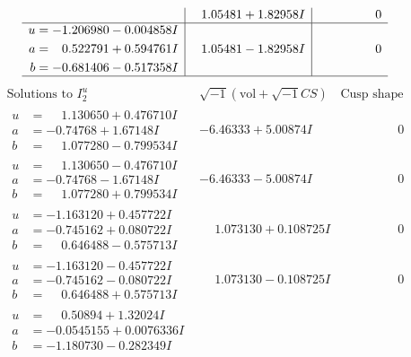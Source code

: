 \documentclass[1p]{elsarticle_modified}
\theoremstyle{definition}
\newcommand{\I}{\sqrt{-1}}
\begin{document}
$$\begin{array}{c|c|c}
 & \phantom{-}1.05481 + 1.82958 I & \phantom{-0.000000 } 0 \\ \hline\begin{aligned}
u &= -1.206980 - 0.004858 I \\
a &= \phantom{-}0.522791 + 0.594761 I \\
b &= -0.681406 - 0.517358 I\end{aligned}
 & \phantom{-}1.05481 - 1.82958 I & \phantom{-0.000000 } 0\\
 \hline 
 \end{array}$$\newpage$$\begin{array}{c|c|c}  
\text{Solutions to }I^u_{2}& \I (\text{vol} + \sqrt{-1}CS) & \text{Cusp shape}\\
 \hline 
\begin{aligned}
u &= \phantom{-}1.130650 + 0.476710 I \\
a &= -0.74768 + 1.67148 I \\
b &= \phantom{-}1.077280 - 0.799534 I\end{aligned}
 & -6.46333 + 5.00874 I & \phantom{-0.000000 } 0 \\ \hline\begin{aligned}
u &= \phantom{-}1.130650 - 0.476710 I \\
a &= -0.74768 - 1.67148 I \\
b &= \phantom{-}1.077280 + 0.799534 I\end{aligned}
 & -6.46333 - 5.00874 I & \phantom{-0.000000 } 0 \\ \hline\begin{aligned}
u &= -1.163120 + 0.457722 I \\
a &= -0.745162 + 0.080722 I \\
b &= \phantom{-}0.646488 - 0.575713 I\end{aligned}
 & \phantom{-}1.073130 + 0.108725 I & \phantom{-0.000000 } 0 \\ \hline\begin{aligned}
u &= -1.163120 - 0.457722 I \\
a &= -0.745162 - 0.080722 I \\
b &= \phantom{-}0.646488 + 0.575713 I\end{aligned}
 & \phantom{-}1.073130 - 0.108725 I & \phantom{-0.000000 } 0 \\ \hline\begin{aligned}
u &= \phantom{-}0.50894 + 1.32024 I \\
a &= -0.0545155 + 0.0076336 I \\
b &= -1.180730 - 0.282349 I\end{aligned}

\end{array}$$
\end{document}
